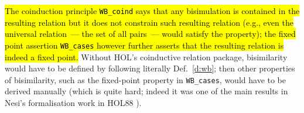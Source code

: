 \hl{The coinduction principle \texttt{WB_coind} says that any
bisimulation is contained in the resulting relation 
 but it does not constrain such resulting relation
(e.g.,  even the universal relation~--- the set of all pairs~---
 would satisfy the property); the
 fixed point assertion \texttt{WB_cases} however
further asserts that the resulting relation is indeed a
fixed point. 
}
%
Without HOL's coinductive relation package, bisimilarity
would have to be defined by following literally
Def.~\ref{d:wb};  then other properties of bisimilarity, such
as the fixed-point property in \texttt{WB_cases}, would have to be
derived manually (which is quite hard; indeed it was one of the main results
in Nesi's formalisation work  in HOL88 \cite{Nesi:1992ve}).

